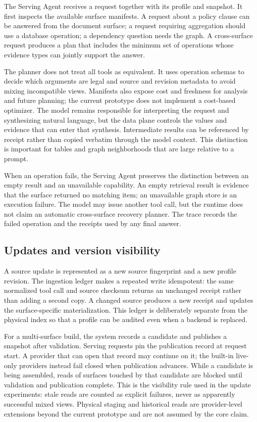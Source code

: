 The Serving Agent receives a request together with its profile and snapshot. It
first inspects the available surface manifests. A request about a policy clause
can be answered from the document surface; a request requiring aggregation
should use a database operation; a dependency question needs the graph. A
cross-surface request produces a plan that includes the minimum set of
operations whose evidence types can jointly support the answer.

The planner does not treat all tools as equivalent. It uses operation schemas
to decide which arguments are legal and source and revision metadata to avoid
mixing incompatible views. Manifests also expose cost and freshness for
analysis and future planning; the current prototype does not implement a
cost-based optimizer.
The model remains responsible for interpreting the request and synthesizing
natural language, but the data plane controls the values and evidence that can
enter that synthesis. Intermediate results can be referenced by receipt rather
than copied verbatim through the model context. This distinction is important
for tables and graph neighborhoods that are large relative to a prompt.

When an operation fails, the Serving Agent preserves the distinction between
an empty result and an unavailable capability. An empty retrieval result is
evidence that the surface returned no matching item; an unavailable graph
store is an execution failure. The model may issue another tool call, but the
runtime does not claim an automatic cross-surface recovery planner. The trace
records the failed operation and the receipts used by any final answer.

\subsection{Updates and version visibility}
\label{sec:updates}

A source update is represented as a new source fingerprint and a new profile
revision. The ingestion ledger makes a repeated write idempotent: the same
normalized tool call and source checksum returns an unchanged receipt rather
than adding a second copy. A changed source produces a new receipt and updates
the surface-specific materialization. This ledger is deliberately separate
from the physical index so that a profile can be audited even when a backend
is replaced.

For a multi-surface build, the system records a candidate and publishes a
snapshot after validation. Serving requests pin the publication record at
request start. A provider that can open that record may continue on it; the
built-in live-only providers instead fail closed when publication advances.
While a candidate is being assembled, reads of surfaces touched by that
candidate are blocked until validation and publication complete.
This is the visibility rule used in the update experiments: stale reads are
counted as explicit failures, never as apparently successful mixed views.
Physical staging and historical reads are provider-level extensions beyond
the current prototype and are not assumed by the core claim.

